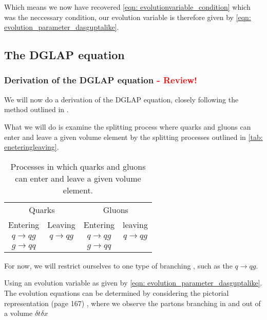 \documentclass[main.tex]{subfiles}
\begin{document}
Which means we now have recovered \autoref{eqn: evolutionvariable_condition} which was the neccessary condition, our evolution variable is therefore given by \autoref{eqn: evolution_parameter_dasguptalike}. 

\newpage
\subsection{The DGLAP equation} %
\subsubsection{Derivation of the DGLAP equation \textcolor{red}{ - Review!}}
We will now do a derivation of the DGLAP equation, closely following the method outlined in \cite{ellis_stirling_webber_1996}.

What we will do is examine the splitting process where quarks and gluons can enter and leave a given volume element by the splitting processes outlined in \autoref{tab: eneteringleaving}.

\begin{table}[h]
    \centering
    \begin{tabular}[]{cccc}
        \multicolumn{2}{c}{Quarks} & \multicolumn{2}{c}{Gluons} \\
        \cmidrule(lr){1-2} \cmidrule(lr){3-4}
        Entering & Leaving & Entering & leaving \\
        \cmidrule(lr){1-1}\cmidrule(lr){2-2}\cmidrule(lr){3-3}\cmidrule(lr){4-4}
        \(q \rightarrow qg\) & \(q \rightarrow qg\) & \(q \rightarrow qg\) & \(q \rightarrow qg\) \\
        \(g \rightarrow qq\) & \(\) & \(g \rightarrow qq\) & \(\) \\
        \bottomrule
    \end{tabular}
    \caption{Processes in which quarks and gluons can enter and leave a given volume element.}
    \label{tab: eneteringleaving}
\end{table}

For now, we will restrict ourselves to one type of branching , such as the \(q\rightarrow qg\).

Using an evolution variable as given by \autoref{eqn: evolution_parameter_dasguptalike}.
The evolution equations can be determined by considering the pictorial representation (page 167) \cite{ellis_stirling_webber_1996}, where we observe the partons branching in and out of a volume \(\delta t \delta x\)
\end{document}
